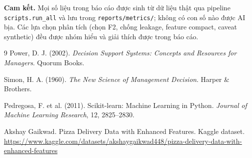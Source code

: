 \documentclass[12pt,a4paper,oneside]{report}
\newcommand{\code}[1]{\nolinkurl{#1}}
\begin{document}
\noindent\textbf{Cam kết.} Mọi số liệu trong báo cáo được sinh từ dữ liệu thật
qua pipeline \code{scripts.run\_all} và lưu trong \code{reports/metrics/};
không có con số nào được AI bịa. Các lựa chọn phân tích (chọn F2, chống leakage,
feature compact, caveat synthetic) đều được nhóm hiểu và giải thích được trong
báo cáo.

\begin{thebibliography}{9}
Power, D. J. (2002). \emph{Decision Support Systems: Concepts and Resources
for Managers}. Quorum Books.

Simon, H. A. (1960). \emph{The New Science of Management Decision}. Harper \&
Brothers.

Pedregosa, F. et al. (2011). Scikit-learn: Machine Learning in Python.
\emph{Journal of Machine Learning Research}, 12, 2825--2830.

Akshay Gaikwad. Pizza Delivery Data with Enhanced Features. Kaggle dataset.
\url{https://www.kaggle.com/datasets/akshaygaikwad448/pizza-delivery-data-with-enhanced-features}
\end{thebibliography}
\end{document}
